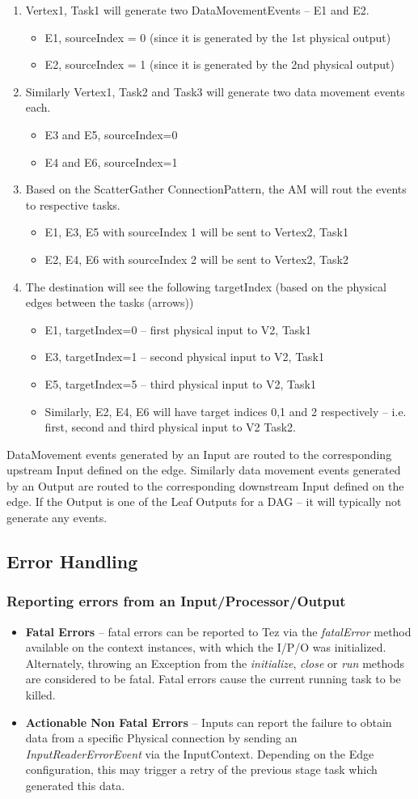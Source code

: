 \documentclass[twocolumn]{article}
\newcommand{\bi}{\begin{itemize}}
\newcommand{\ei}{\end{itemize}}
\newcommand{\be}{\begin{enumerate}}
\newcommand{\ee}{\end{enumerate}}
\newcommand{\ii}{\item}
\begin{document}
\be
\ii Vertex1, Task1 will generate two DataMovementEvents -- E1 and E2.
\bi
\ii E1, sourceIndex = 0 (since it is generated by the 1st physical output) 
\ii E2, sourceIndex = 1 (since it is generated by the 2nd physical output)
\ei
\ii Similarly Vertex1, Task2 and Task3 will generate two data movement
events each. 
\bi
\ii E3 and E5, sourceIndex=0 
\ii E4 and E6, sourceIndex=1
\ei
\ii Based on the ScatterGather ConnectionPattern, the AM will rout the
events to respective tasks. 
\bi
\ii E1, E3, E5 with sourceIndex 1 will be sent
to Vertex2, Task1 
\ii E2, E4, E6 with sourceIndex 2 will be sent to Vertex2,
Task2
\ei
\ii The destination will see the following targetIndex (based on the
physical edges between the tasks (arrows)) 
\bi
\ii E1, targetIndex=0 -- first
physical input to V2, Task1 
\ii E3, targetIndex=1 -- second physical input
to V2, Task1 
\ii E5, targetIndex=5 -- third physical input to V2, Task1
\ii Similarly, E2, E4, E6 will have target indices 0,1 and 2 respectively --
i.e. first, second and third physical input to V2 Task2.
\ei
\ee
DataMovement events generated by an Input are routed to the
corresponding upstream Input defined on the edge. Similarly data
movement events generated by an Output are routed to the corresponding
downstream Input defined on the edge.
If the Output is one of the Leaf Outputs for a DAG -- it will typically
not generate any events.

\subsection{Error Handling}
\subsubsection*{Reporting errors from an Input/Processor/Output}
\bi
\ii \textbf{Fatal Errors} -- fatal errors can be reported to Tez via the \textit{fatalError} method available on the
context instances, with which the I/P/O was initialized. Alternately,
throwing an Exception from the \textit{initialize}, \textit{close} or \textit{run} methods are
considered to be fatal. Fatal errors cause the current running task to
be killed. 
\ii \textbf{Actionable Non Fatal Errors} -- Inputs can report the failure
to obtain data from a specific Physical connection by sending an
\textit{InputReaderErrorEvent} via the InputContext. Depending on the Edge
configuration, this may trigger a retry of the previous stage task which
generated this data. 
\ei
\end{document}
